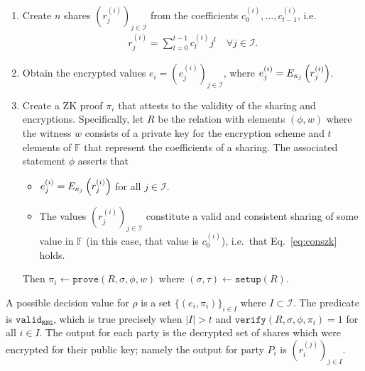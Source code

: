 \documentclass{article}
\theoremstyle{remark}
\newcommand{\F}{\mathbb{F}}
\begin{document}
\begin{enumerate}
	\item Create $n$ shares ${\left(r_j^{(i)}\right)}_{j \in \mathcal{I}}$ from
		the coefficients $c_0^{(i)}, \ldots, c_{t-1}^{(i)}$, i.e.
		\begin{align}\label{eq:conszk}
			r_j^{(i)} = \sum_{l=0}^{t-1} c_l^{(i)}j^l
			\quad
			\forall j \in \mathcal{I}.
		\end{align}
	\item Obtain the encrypted values $e_i = {\left(e_j^{(i)}\right)}_{j \in
		\mathcal{I}}$, where $e_j^{(i)} = E_{\kappa_j}\left(r_j^{(i)}\right)$.
	\item Create a ZK proof $\pi_i$ that attests to the validity of the sharing
		and encryptions. Specifically, let $R$ be the relation with elements
		$(\phi, w)$ where the witness $w$ consists of a private key for the
		encryption scheme and $t$ elements of $\F$ that represent the
		coefficients of a sharing. The associated statement $\phi$ asserts that
		\begin{itemize}
			\item $e_j^{(i)} = E_{\kappa_j}\left(r_j^{(i)}\right)$ for all
				$j \in \mathcal{I}$.
			\item The values ${\left(r_j^{(i)}\right)}_{j \in \mathcal{I}}$
				constitute a valid and consistent sharing of some value in $\F$
				(in this case, that value is $c_0^{(i)}$), i.e.\ that
				Eq.~\eqref{eq:conszk} holds.
		\end{itemize}
		Then $\pi_i \leftarrow \texttt{prove}(R, \sigma, \phi, w)$ where
		$(\sigma, \tau) \leftarrow \texttt{setup}(R)$.
\end{enumerate}

A possible decision value for $\rho$ is a set ${\{(e_i, \pi_i)\}}_{i \in I}$
where $I \subset \mathcal{I}$. The predicate is $\texttt{valid}_\texttt{RNG}$,
which is true precisely when $|I| > t$ and $\texttt{verify}(R, \sigma, \phi,
\pi_i) = 1$ for all $i \in I$. The output for each party is the decrypted set
of shares which were encrypted for their public key; namely the output for
party $P_i$ is ${(r_i^{(j)})}_{j \in I}$.
\end{document}
